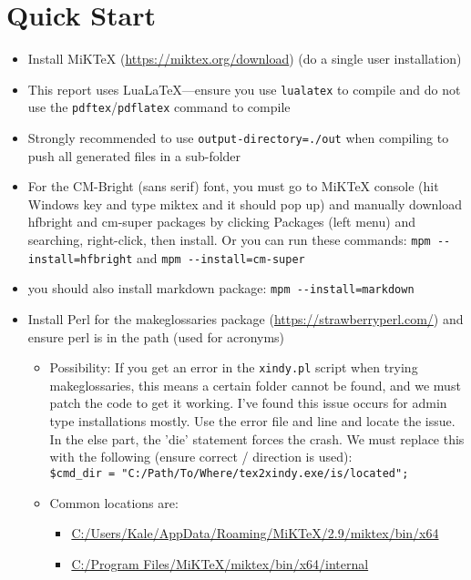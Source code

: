 \documentclass{\FormatDir corpboreportMulti}
\begin{document}
\section{Quick Start}
\begin{itemize}
    \item Install MiKTeX (\url{https://miktex.org/download}) (do a single user installation)
    \item This report uses LuaLaTeX---ensure you use \texttt{lualatex} to compile and do not use the \texttt{pdftex}/\texttt{pdflatex} command to compile
    \item Strongly recommended to use \texttt{output-directory=./out} when compiling to push all generated files in a sub-folder
    \item For the CM-Bright (sans serif) font, you must go to MiKTeX console (hit Windows key and type miktex and it should pop up) and manually download hfbright and cm-super packages by clicking Packages (left menu) and searching, right-click, then install. Or you can run these commands: \texttt{mpm -\/-install=hfbright} and \texttt{mpm -\/-install=cm-super}
    \item you should also install markdown package: \texttt{mpm -\/-install=markdown}
    \item Install Perl for the makeglossaries package (\url{https://strawberryperl.com/}) and ensure perl is in the path (used for acronyms)
    \begin{itemize}
        \item Possibility: If you get an error in the \texttt{xindy.pl} script when trying makeglossaries, this means a certain folder cannot be found,
                and we must patch the code to get it working. I've found this issue occurs for admin type installations mostly. Use the error file and line and locate the issue. In the else part, the 'die' statement forces the crash.
                We must replace this with the following (ensure correct / direction is used):\\
                \texttt{\$cmd\_dir = "C:/Path/To/Where/tex2xindy.exe/is/located";}
        \item Common locations are:
        \begin{itemize}
            \item \url{C:/Users/Kale/AppData/Roaming/MiKTeX/2.9/miktex/bin/x64}
            \item \url{C:/Program Files/MiKTeX/miktex/bin/x64/internal}
        \end{itemize}
    \end{itemize}
\end{itemize}
\end{document}
